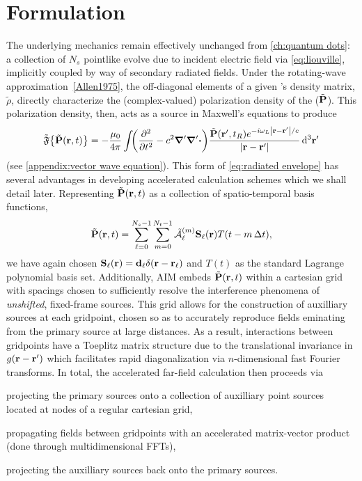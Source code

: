 \section{Formulation}

The underlying mechanics remain effectively unchanged from \cref{ch:quantum dots}: a collection of $N_s$ pointlike \qds{} evolve due to incident electric field via \cref{eq:liouville}, implicitly coupled by way of secondary radiated fields.
Under the rotating-wave approximation~\cref{Allen1975}, the off-diagonal elements of a given \qd's density matrix, $\tilde{\rho}$, directly characterize the (complex-valued) polarization density of the \qd{} ($\tilde{\vb{P}}$).
This polarization density, then, acts as a source in Maxwell's equations to produce
\begin{equation}
  \tilde{\mathfrak{F}}\qty{\tilde{\vb{P}}(\vb{r}, t)} = -\frac{\mu_0}{4\pi} \int_{} \qty(\pdv[2]{t} - c^2 \grad' \grad'\boldsymbol{\cdot}) \frac{\tilde{\vb{P}}(\vb{r}', t_R) e^{-i \omega_L \abs{\vb{r} - \vb{r}'}/c}}{\abs{\vb{r} - \vb{r}'}} \dd[3]{\vb{r}'}
  \label{eq:envelope propagator}
\end{equation}
(see \cref{appendix:vector wave equation}).
This form of \cref{eq:radiated envelope} has several advantages in developing accelerated calculation schemes which we shall detail later.
Representing $\tilde{\vb{P}}(\vb{r}, t)$ as a collection of spatio-temporal basis functions,
\begin{equation}
  \tilde{\vb{P}}(\vb{r}, t) = \sum_{\ell = 0}^{N_s - 1} \sum_{m = 0}^{N_t - 1} \tilde{\mathcal{A}}_\ell^{(m)} \vb{S}_\ell(\vb{r}) T(t - m \, \Delta t),
\end{equation}
we have again chosen $\vb{S}_\ell(\vb{r}) = \vb{d}_\ell \delta(\vb{r} - \vb{r}_\ell)$ and $T(t)$ as the standard Lagrange polynomial basis set.
Additionally, AIM embeds $\tilde{\vb{P}}(\vb{r}, t)$ within a cartesian grid with spacings chosen to sufficiently resolve the interference phenomena of \emph{unshifted}, fixed-frame sources.
This grid allows for the construction of auxilliary sources at each gridpoint, chosen so as to accurately reproduce fields eminating from the primary source at large distances.
As a result, interactions between gridpoints have a Toeplitz matrix structure due to the translational invariance in $g(\vb{r} - \vb{r}')$ which facilitates rapid diagonalization via $n$-dimensional fast Fourier transforms.
In total, the accelerated far-field calculation then proceeds via
\begin{inparaenum}[(i)]
  \item projecting the primary sources onto a collection of auxilliary point sources located at nodes of a regular cartesian grid,
  \item propagating fields between gridpoints with an accelerated matrix-vector product (done through multidimensional FFTs),
  \item projecting the auxilliary sources back onto the primary sources.
\end{inparaenum}

